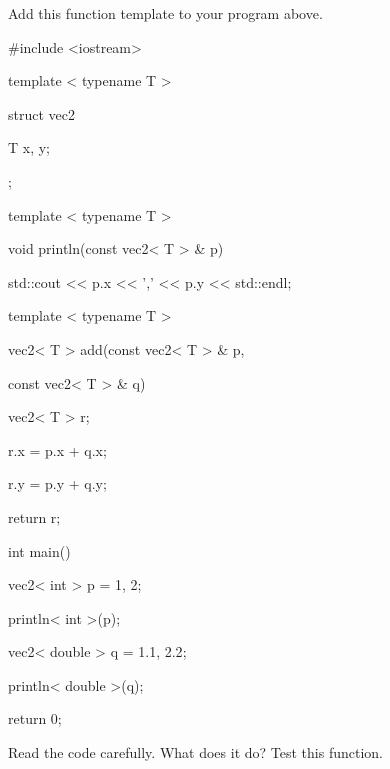 Add this function template to your program above.



\begin{consolethree}[escapeinside=||]

#include <iostream>



template < typename T >

struct vec2

{

    T x, y;

};



template < typename T >

void println(const vec2< T > & p)

{

    std::cout << p.x << ',' << p.y << std::endl;

}



template < typename T >

vec2< T > add(const vec2< T > & p,

              const vec2< T > & q)

{

    vec2< T > r;

    r.x = p.x + q.x;

    r.y = p.y + q.y;

    return r;

}



int main()

{

    vec2< int > p = {1, 2};

    println< int >(p);



    vec2< double > q = {1.1, 2.2};

    println< double >(q);



    return 0;

}

\end{consolethree}



Read the code carefully. What does it do? Test this function.

